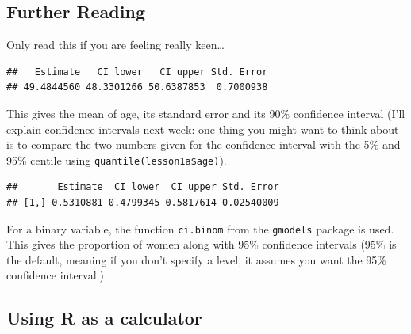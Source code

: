 \documentclass[]{book}
\newenvironment{Shaded}{\begin{snugshade}}{\end{snugshade}}
\newcommand{\CommentTok}[1]{\textcolor[rgb]{0.56,0.35,0.01}{\textit{#1}}}
\newcommand{\DataTypeTok}[1]{\textcolor[rgb]{0.13,0.29,0.53}{#1}}
\newcommand{\FloatTok}[1]{\textcolor[rgb]{0.00,0.00,0.81}{#1}}
\newcommand{\KeywordTok}[1]{\textcolor[rgb]{0.13,0.29,0.53}{\textbf{#1}}}
\newcommand{\NormalTok}[1]{#1}
\newcommand{\OperatorTok}[1]{\textcolor[rgb]{0.81,0.36,0.00}{\textbf{#1}}}
\newcommand{\OtherTok}[1]{\textcolor[rgb]{0.56,0.35,0.01}{#1}}
\begin{document}
\hypertarget{further-reading}{%
\subsection{Further Reading}\label{further-reading}}

Only read this if you are feeling really keen\ldots{}

\begin{Shaded}
\end{Shaded}

\begin{verbatim}
##   Estimate   CI lower   CI upper Std. Error 
## 49.4844560 48.3301266 50.6387853  0.7000938
\end{verbatim}

This gives the mean of age, its standard error and its 90\% confidence interval (I'll explain confidence intervals next week: one thing you might want to think about is to compare the two numbers given for the confidence interval with the 5\% and 95\% centile using \texttt{quantile(lesson1a\$age)}).

\begin{Shaded}
\end{Shaded}

\begin{verbatim}
##       Estimate  CI lower  CI upper Std. Error
## [1,] 0.5310881 0.4799345 0.5817614 0.02540009
\end{verbatim}

For a binary variable, the function \texttt{ci.binom} from the \texttt{gmodels} package is used. This gives the proportion of women along with 95\% confidence intervals (95\% is the default, meaning if you don't specify a level, it assumes you want the 95\% confidence interval.)

\hypertarget{using-r-as-a-calculator}{%
\subsection{Using R as a calculator}\label{using-r-as-a-calculator}}
\end{document}
